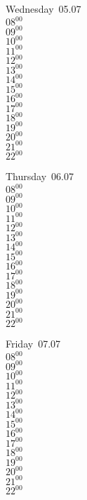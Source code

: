 \documentclass[11pt,a4paper]{book}\usepackage[]{graphicx}\usepackage[]{color}
\begin{document}
\begin{weekdaybox}
  Wednesday~05.07\\
  { 
  \vfill
  $08^{00}$\\
$09^{00}$\\
$10^{00}$\\
$11^{00}$\\
$12^{00}$\\
$13^{00}$\\
$14^{00}$\\
$15^{00}$\\
$16^{00}$\\
$17^{00}$\\
$18^{00}$\\
$19^{00}$\\
$20^{00}$\\
$21^{00}$\\
$22^{00}$\\
  }
\end{weekdaybox}
\clearpage
\begin{headerbox}
\end{headerbox}
\begin{weekdaybox}
  Thursday~06.07\\
  { 
  \vfill
  $08^{00}$\\
$09^{00}$\\
$10^{00}$\\
$11^{00}$\\
$12^{00}$\\
$13^{00}$\\
$14^{00}$\\
$15^{00}$\\
$16^{00}$\\
$17^{00}$\\
$18^{00}$\\
$19^{00}$\\
$20^{00}$\\
$21^{00}$\\
$22^{00}$\\
  }
\end{weekdaybox} 
\begin{weekdaybox}
  Friday~07.07\\
  { 
  \vfill
  $08^{00}$\\
$09^{00}$\\
$10^{00}$\\
$11^{00}$\\
$12^{00}$\\
$13^{00}$\\
$14^{00}$\\
$15^{00}$\\
$16^{00}$\\
$17^{00}$\\
$18^{00}$\\
$19^{00}$\\
$20^{00}$\\
$21^{00}$\\
$22^{00}$\\
  }
\end{weekdaybox}
\end{document}
